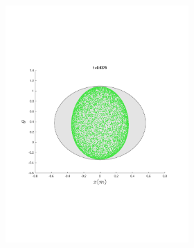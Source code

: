 \begin{figure}
{\begin{subfigure}{0.5\textwidth}
\begin{subfigure}[b]{0.5\textwidth}
        \includegraphics[trim={1cm 7cm 1cm 7cm},
        width=\textwidth]{figures/method/FunnelSimOverlaid6funnel-1y-theta}
      \end{subfigure}%
      \begin{subfigure}[b]{0.5\textwidth}

\end{subfigure}
\end{subfigure}}
\end{figure}
